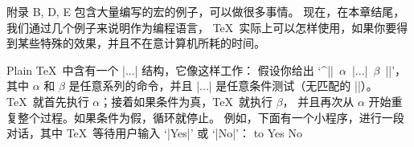 {{{{{{{{{{%
\ddanger 附录 B, D, E 包含大量编写的宏的例子，可以做很多事情。%
现在，在本章结尾，我们通过几个例子来说明作为编程语言，
 \TeX\ 实际上可以怎样使用，如果你要得到某些特殊的效果，并且不在意计算机所耗的时间。

\ddanger Plain \TeX\ 中含有一个 |\loop...\repeat| 结构，它像这样工作：
假设你给出 `^|\loop|~$\alpha$~|\if...|~$\beta$~|\repeat|'，
其中 $\alpha$ 和 $\beta$ 是任意系列的命令，并且 |\if...| 是任意条件测试（无匹配的 |\fi|）。
\TeX\ 就首先执行 $\alpha$；接着如果条件为真，\TeX\ 就执行 $\beta$，
并且再次从 $\alpha$ 开始重复整个过程。如果条件为假，循环就停止。
\1例如，下面有一个小程序，进行一段对话，其中 \TeX\ 等待用户输入 `|Yes|' 或 `|No|'：
\begintt
\def\yes{Yes } \def\no{No } \newif\ifgarbage
\loop{}
   to\answer
  \ifx\answer\yes\garbagefalse %
    \else\ifx\answer\no\garbagefalse %
      \else\garbagetrue\fi\fi %
  \ifgarbage{}
\repeat
\endtt

}}}}}}}}}}
